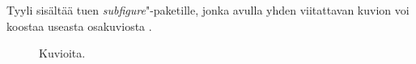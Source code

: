 \noindent Tyyli sisältää tuen \emph{subfigure}"-paketille, jonka avulla yhden viitattavan kuvion  voi koostaa useasta osakuviosta .

\begin{figure}[h]
\hspace{0.75cm}
\caption[Kuvioita]{Kuvioita.}
\label{fig:Kuvioita}
\end{figure}
